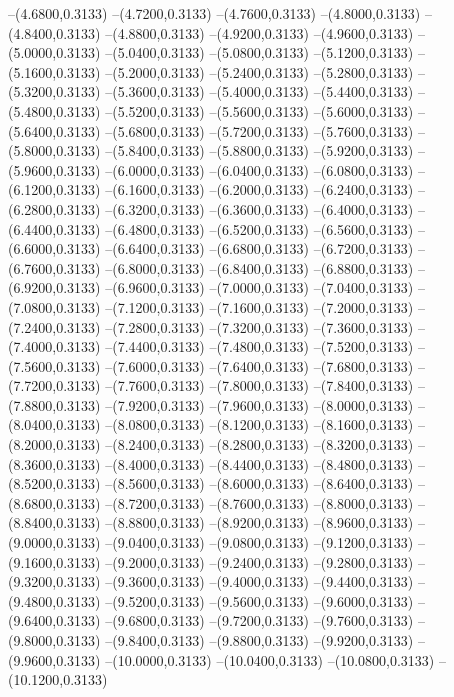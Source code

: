 {	--(4.6800,0.3133)
	--(4.7200,0.3133)
	--(4.7600,0.3133)
	--(4.8000,0.3133)
	--(4.8400,0.3133)
	--(4.8800,0.3133)
	--(4.9200,0.3133)
	--(4.9600,0.3133)
	--(5.0000,0.3133)
	--(5.0400,0.3133)
	--(5.0800,0.3133)
	--(5.1200,0.3133)
	--(5.1600,0.3133)
	--(5.2000,0.3133)
	--(5.2400,0.3133)
	--(5.2800,0.3133)
	--(5.3200,0.3133)
	--(5.3600,0.3133)
	--(5.4000,0.3133)
	--(5.4400,0.3133)
	--(5.4800,0.3133)
	--(5.5200,0.3133)
	--(5.5600,0.3133)
	--(5.6000,0.3133)
	--(5.6400,0.3133)
	--(5.6800,0.3133)
	--(5.7200,0.3133)
	--(5.7600,0.3133)
	--(5.8000,0.3133)
	--(5.8400,0.3133)
	--(5.8800,0.3133)
	--(5.9200,0.3133)
	--(5.9600,0.3133)
	--(6.0000,0.3133)
	--(6.0400,0.3133)
	--(6.0800,0.3133)
	--(6.1200,0.3133)
	--(6.1600,0.3133)
	--(6.2000,0.3133)
	--(6.2400,0.3133)
	--(6.2800,0.3133)
	--(6.3200,0.3133)
	--(6.3600,0.3133)
	--(6.4000,0.3133)
	--(6.4400,0.3133)
	--(6.4800,0.3133)
	--(6.5200,0.3133)
	--(6.5600,0.3133)
	--(6.6000,0.3133)
	--(6.6400,0.3133)
	--(6.6800,0.3133)
	--(6.7200,0.3133)
	--(6.7600,0.3133)
	--(6.8000,0.3133)
	--(6.8400,0.3133)
	--(6.8800,0.3133)
	--(6.9200,0.3133)
	--(6.9600,0.3133)
	--(7.0000,0.3133)
	--(7.0400,0.3133)
	--(7.0800,0.3133)
	--(7.1200,0.3133)
	--(7.1600,0.3133)
	--(7.2000,0.3133)
	--(7.2400,0.3133)
	--(7.2800,0.3133)
	--(7.3200,0.3133)
	--(7.3600,0.3133)
	--(7.4000,0.3133)
	--(7.4400,0.3133)
	--(7.4800,0.3133)
	--(7.5200,0.3133)
	--(7.5600,0.3133)
	--(7.6000,0.3133)
	--(7.6400,0.3133)
	--(7.6800,0.3133)
	--(7.7200,0.3133)
	--(7.7600,0.3133)
	--(7.8000,0.3133)
	--(7.8400,0.3133)
	--(7.8800,0.3133)
	--(7.9200,0.3133)
	--(7.9600,0.3133)
	--(8.0000,0.3133)
	--(8.0400,0.3133)
	--(8.0800,0.3133)
	--(8.1200,0.3133)
	--(8.1600,0.3133)
	--(8.2000,0.3133)
	--(8.2400,0.3133)
	--(8.2800,0.3133)
	--(8.3200,0.3133)
	--(8.3600,0.3133)
	--(8.4000,0.3133)
	--(8.4400,0.3133)
	--(8.4800,0.3133)
	--(8.5200,0.3133)
	--(8.5600,0.3133)
	--(8.6000,0.3133)
	--(8.6400,0.3133)
	--(8.6800,0.3133)
	--(8.7200,0.3133)
	--(8.7600,0.3133)
	--(8.8000,0.3133)
	--(8.8400,0.3133)
	--(8.8800,0.3133)
	--(8.9200,0.3133)
	--(8.9600,0.3133)
	--(9.0000,0.3133)
	--(9.0400,0.3133)
	--(9.0800,0.3133)
	--(9.1200,0.3133)
	--(9.1600,0.3133)
	--(9.2000,0.3133)
	--(9.2400,0.3133)
	--(9.2800,0.3133)
	--(9.3200,0.3133)
	--(9.3600,0.3133)
	--(9.4000,0.3133)
	--(9.4400,0.3133)
	--(9.4800,0.3133)
	--(9.5200,0.3133)
	--(9.5600,0.3133)
	--(9.6000,0.3133)
	--(9.6400,0.3133)
	--(9.6800,0.3133)
	--(9.7200,0.3133)
	--(9.7600,0.3133)
	--(9.8000,0.3133)
	--(9.8400,0.3133)
	--(9.8800,0.3133)
	--(9.9200,0.3133)
	--(9.9600,0.3133)
	--(10.0000,0.3133)
	--(10.0400,0.3133)
	--(10.0800,0.3133)
	--(10.1200,0.3133)
}
